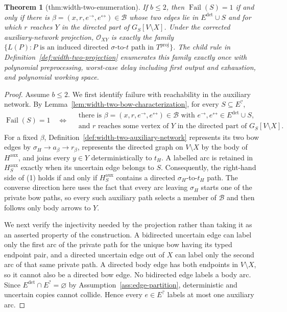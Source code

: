 \documentclass{article}
\newtheorem{theorem}{Theorem}
\begin{document}
\begin{theorem}[thm:width-two-enumeration]\label{thm:width-two-enumeration}
If \(b\le2\), then \(\operatorname{Fail}(S)=1\) if and only if there is \(\beta=(x,r,e^{\to},e^{\leftrightarrow})\in\mathcal B\) whose two edges lie in \(E^{\mathrm{det}}\cup S\) and for which \(r\) reaches \(Y\) in the directed part of \(G_S[V\setminus X]\).  Under the corrected auxiliary-network projection, \(\mathcal O_{XY}\) is exactly the family \(\{L(P):P\text{ is an induced directed }\sigma\text{-to-}t\text{ path in }T^{\mathrm{proj}}\}\).  The child rule in Definition~\ref{def:width-two-projection} enumerates this family exactly once with polynomial preprocessing, worst-case delay including first output and exhaustion, and polynomial working space.
\end{theorem}
\begin{proof}
Assume \(b\leq 2\).  We first identify failure with reachability in the auxiliary network.  By Lemma~\ref{lem:width-two-bow-characterization}, for every \(S\subseteq E^{?}\),
\[
 \operatorname{Fail}(S)=1
 \quad\Longleftrightarrow\quad
 \begin{gathered}
 \text{there is }\beta=(x,r,e^{\to},e^{\leftrightarrow})\in\mathcal B
 \text{ with }e^{\to},e^{\leftrightarrow}\in E^{\mathrm{det}}\cup S,\\
 \text{and }r\text{ reaches some vertex of }Y
 \text{ in the directed part of }G_S[V\setminus X].
 \end{gathered}
\tag{1}
\]
For a fixed \(\beta\), Definition~\ref{def:width-two-auxiliary-network} represents its two bow edges by
\(\sigma_H\to a_\beta\to r_\beta\), represents the directed graph on \(V\setminus X\) by the body of \(H^{\mathrm{aux}}\), and joins every \(y\in Y\) deterministically to \(t_H\).  A labelled arc is retained in \(H^{\mathrm{aux}}_S\) exactly when its uncertain edge belongs to \(S\).  Consequently, the right-hand side of (1) holds if and only if \(H^{\mathrm{aux}}_S\) contains a directed \(\sigma_H\)-to-\(t_H\) path.  The converse direction here uses the fact that every arc leaving \(\sigma_H\) starts one of the private bow paths, so every such auxiliary path selects a member of \(\mathcal B\) and then follows only body arrows to \(Y\).

We next verify the injectivity needed by the projection rather than taking it as an asserted property of the construction.  A bidirected uncertain edge can label only the first arc of the private path for the unique bow having its typed endpoint pair, and a directed uncertain edge out of \(X\) can label only the second arc of that same private path.  A directed body edge has both endpoints in \(V\setminus X\), so it cannot also be a directed bow edge.  No bidirected edge labels a body arc.  Since \(E^{\mathrm{det}}\cap E^{?}=\varnothing\) by Assumption~\ref{ass:edge-partition}, deterministic and uncertain copies cannot collide.  Hence every \(e\in E^{?}\) labels at most one auxiliary arc.


\end{proof}
\end{document}
